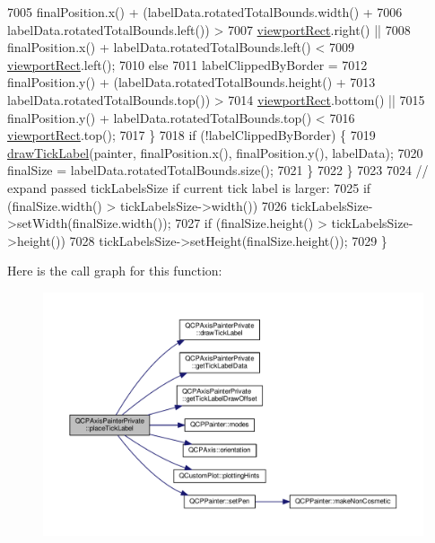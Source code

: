 \begin{DoxyCode}
7005             finalPosition.x() + (labelData.rotatedTotalBounds.width() +
7006                                  labelData.rotatedTotalBounds.left()) >
7007                 \hyperlink{class_q_c_p_axis_painter_private_a8627dc6b40781e3291bb508e4ac574d6}{viewportRect}.right() ||
7008             finalPosition.x() + labelData.rotatedTotalBounds.left() <
7009                 \hyperlink{class_q_c_p_axis_painter_private_a8627dc6b40781e3291bb508e4ac574d6}{viewportRect}.left();
7010       \textcolor{keywordflow}{else}
7011         labelClippedByBorder =
7012             finalPosition.y() + (labelData.rotatedTotalBounds.height() +
7013                                  labelData.rotatedTotalBounds.top()) >
7014                 \hyperlink{class_q_c_p_axis_painter_private_a8627dc6b40781e3291bb508e4ac574d6}{viewportRect}.bottom() ||
7015             finalPosition.y() + labelData.rotatedTotalBounds.top() <
7016                 \hyperlink{class_q_c_p_axis_painter_private_a8627dc6b40781e3291bb508e4ac574d6}{viewportRect}.top();
7017     \}
7018     \textcolor{keywordflow}{if} (!labelClippedByBorder) \{
7019       \hyperlink{class_q_c_p_axis_painter_private_ad8f2f12cd35b8189e8bf96679e873933}{drawTickLabel}(painter, finalPosition.x(), finalPosition.y(), labelData);
7020       finalSize = labelData.rotatedTotalBounds.size();
7021     \}
7022   \}
7023 
7024   \textcolor{comment}{// expand passed tickLabelsSize if current tick label is larger:}
7025   \textcolor{keywordflow}{if} (finalSize.width() > tickLabelsSize->width())
7026     tickLabelsSize->setWidth(finalSize.width());
7027   \textcolor{keywordflow}{if} (finalSize.height() > tickLabelsSize->height())
7028     tickLabelsSize->setHeight(finalSize.height());
7029 \}
\end{DoxyCode}


Here is the call graph for this function\+:\nopagebreak
\begin{figure}[H]
\begin{center}
\leavevmode
\includegraphics[width=350pt]{class_q_c_p_axis_painter_private_af8fe7350c19575bc33ca770f9b3a15fd_cgraph}
\end{center}
\end{figure}




